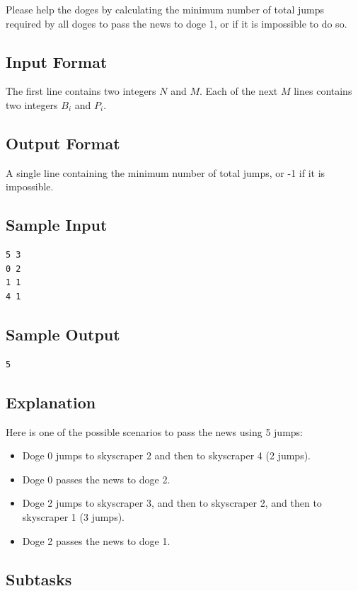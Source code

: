 \documentclass[a4paper]{article}
\begin{document}
Please help the doges by calculating the minimum number of total jumps required by all doges to pass the news to doge 1, or if it is impossible to do so.

\subsection*{Input Format}
The first line contains two integers $N$ and $M$. Each of the next $M$ lines contains two integers $B_i$ and $P_i$.

\subsection*{Output Format}
A single line containing the minimum number of total jumps, or -1 if it is impossible.

\subsection*{Sample Input}
\begin{verbatim}
5 3
0 2
1 1
4 1
\end{verbatim}

\subsection*{Sample Output}
\begin{verbatim}
5
\end{verbatim}

\subsection*{Explanation}
Here is one of the possible scenarios to pass the news using 5 jumps:
\begin{itemize} \itemsep1pt \parskip0pt
\item Doge 0 jumps to skyscraper 2 and then to skyscraper 4 (2 jumps).
\item Doge 0 passes the news to doge 2.
\item Doge 2 jumps to skyscraper 3, and then to skyscraper 2, and then to skyscraper 1 (3 jumps).
\item Doge 2 passes the news to doge 1.
\end{itemize}

\subsection*{Subtasks}
\end{document}
